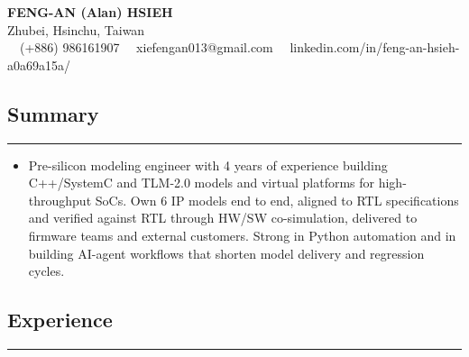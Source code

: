 \documentclass[11pt,a4paper]{article}
\begin{document}
\begin{center}
	{\LARGE \textbf{FENG-AN (Alan) HSIEH}}\\
	Zhubei, Hsinchu, Taiwan
	\vspace{0.05cm}
	\\
	\raisebox{-0.2\height}{\Large \faPhoneSquare} \ \ (+886) 986161907
    \raisebox{-0.2\height}{\Large \faEnvelopeSquare} \ \ xiefengan013@gmail.com
    \raisebox{-0.2\height}{\Large \faLinkedinSquare} \ \ linkedin.com/in/feng-an-hsieh-a0a69a15a/
\end{center}

\subsection*{\large Summary}
\hrule
\vspace{0.3em}

\begin{itemize}[leftmargin=1em,noitemsep]
	\item[]
    Pre-silicon modeling engineer with 4 years of experience building C++/SystemC and TLM-2.0 models and virtual platforms for high-throughput SoCs. Own 6 IP models end to end, aligned to RTL specifications and verified against RTL through HW/SW co-simulation, delivered to firmware teams and external customers. Strong in Python automation and in building AI-agent workflows that shorten model delivery and regression cycles.
\end{itemize}

\subsection*{\large Experience}
\hrule
\vspace{0.3em}
\end{document}
